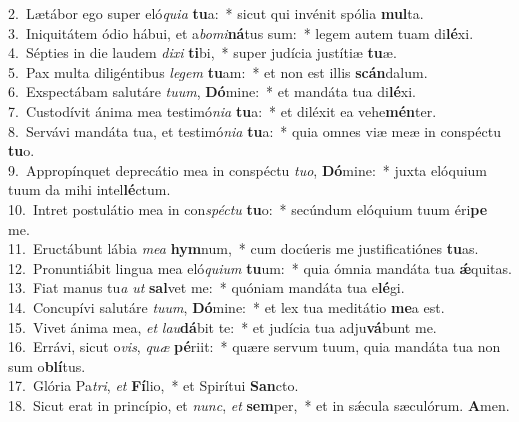 {2.~}Lætábor ego super eló\textit{qui}\textit{a} \textbf{tu}a:~* sicut qui invénit spólia \textbf{mul}ta.\\
{3.~}Iniquitátem ódio hábui, et a\textit{bo}\textit{mi}\textbf{ná}tus sum:~* legem autem tuam di\textbf{lé}xi.\\
{4.~}Sépties in die laudem \textit{di}\textit{xi} \textbf{ti}bi,~* super judícia justítiæ \textbf{tu}æ.\\
{5.~}Pax multa diligéntibus \textit{le}\textit{gem} \textbf{tu}am:~* et non est illis \textbf{scán}dalum.\\
{6.~}Exspectábam salutáre \textit{tu}\textit{um}, \textbf{Dó}mine:~* et mandáta tua di\textbf{lé}xi.\\
{7.~}Custodívit ánima mea testimó\textit{ni}\textit{a} \textbf{tu}a:~* et diléxit ea vehe\textbf{mén}ter.\\
{8.~}Servávi mandáta tua, et testimó\textit{ni}\textit{a} \textbf{tu}a:~* quia omnes viæ meæ in conspéctu \textbf{tu}o.\\
{9.~}Appropínquet deprecátio mea in conspéctu \textit{tu}\textit{o}, \textbf{Dó}mine:~* juxta elóquium tuum da mihi intel\textbf{lé}ctum.\\
{10.~}Intret postulátio mea in con\textit{spé}\textit{ctu} \textbf{tu}o:~* secúndum elóquium tuum éri\textbf{pe} me.\\
{11.~}Eructábunt lábia \textit{me}\textit{a} \textbf{hym}num,~* cum docúeris me justificatiónes \textbf{tu}as.\\
{12.~}Pronuntiábit lingua mea eló\textit{qui}\textit{um} \textbf{tu}um:~* quia ómnia mandáta tua \textbf{ǽ}quitas.\\
{13.~}Fiat manus tu\textit{a} \textit{ut} \textbf{sal}vet me:~* quóniam mandáta tua e\textbf{lé}gi.\\
{14.~}Concupívi salutáre \textit{tu}\textit{um}, \textbf{Dó}mine:~* et lex tua meditátio \textbf{me}a est.\\
{15.~}Vivet ánima mea, \textit{et} \textit{lau}\textbf{dá}bit te:~* et judícia tua adju\textbf{vá}bunt me.\\
{16.~}Errávi, sicut o\textit{vis}, \textit{quæ} \textbf{pé}riit:~* quære servum tuum, quia mandáta tua non sum o\textbf{blí}tus.\\
{17.~}Glória Pa\textit{tri}, \textit{et} \textbf{Fí}lio,~* et Spirítui \textbf{San}cto.\\
{18.~}Sicut erat in princípio, et \textit{nunc}, \textit{et} \textbf{sem}per,~* et in sǽcula sæculórum. \textbf{A}men.\\
